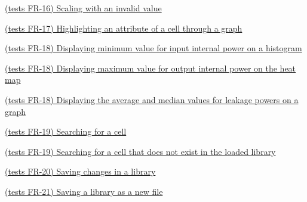 \documentclass[10pt,a4paper]{report}
\newcommand{\refer}[2]{\hyperref[#1]{\textcolor{col:reference}{#2}}}
\begin{document}
\begin{GTC}
    \item  \refer{GTC-41} {(tests FR-16) Scaling with an invalid value}
    \item  \refer{GTC-42} {(tests FR-17) Highlighting an attribute of a cell through a graph}
    \item  \refer{GTC-43} {(tests FR-18)  Displaying minimum value for input internal power on a histogram}
    \item  \refer{GTC-44} {(tests FR-18)  Displaying maximum value for output internal power on the heat map}
    \item  \refer{GTC-45} {(tests FR-18)  Displaying the average and median values for leakage powers on a graph}
    \item  \refer{GTC-46} {(tests FR-19) Searching for a cell}
    \item  \refer{GTC-47} {(tests FR-19) Searching for a cell that does not exist in the loaded library}
    \item  \refer{GTC-48} {(tests FR-20) Saving changes in a library}
    \item  \refer{GTC-49} {(tests FR-21) Saving a library as a new file}
    
\end{GTC}
\end{document}
